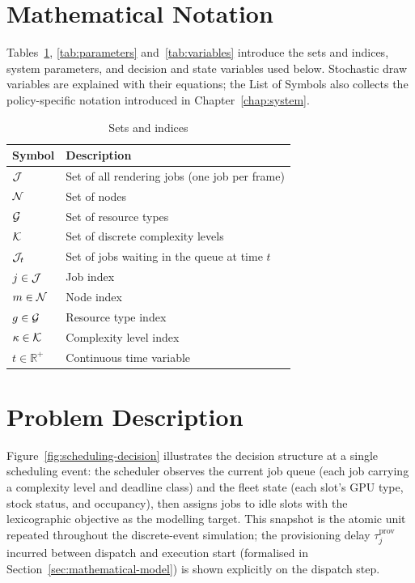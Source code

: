 \section{Mathematical Notation}
\label{sec:mathematical-notation}

Tables~\ref{tab:sets}, \ref{tab:parameters} and~\ref{tab:variables} introduce the sets and indices, system parameters, and decision and state variables used below. Stochastic draw variables are explained with their equations; the List of Symbols also collects the policy-specific notation introduced in Chapter~\ref{chap:system}.

\begin{table}[htbp]
\centering
\caption{Sets and indices}
\label{tab:sets}
\begin{tabular}{ll}
\toprule
\textbf{Symbol} & \textbf{Description} \\
\midrule
$\mathcal{J}$ & Set of all rendering jobs (one job per frame) \\
$\mathcal{N}$ & Set of nodes \\
$\mathcal{G}$ & Set of resource types \\
$\mathcal{K}$ & Set of discrete complexity levels \\
$\mathcal{J}_t$ & Set of jobs waiting in the queue at time $t$ \\
$j \in \mathcal{J}$ & Job index \\
$m \in \mathcal{N}$ & Node index \\
$g \in \mathcal{G}$ & Resource type index \\
$\kappa \in \mathcal{K}$ & Complexity level index \\
$t \in \mathbb{R}^+$ & Continuous time variable \\
\bottomrule
\end{tabular}
\end{table}

\section{Problem Description}
\label{sec:problem-description}

Figure~\ref{fig:scheduling-decision} illustrates the decision structure at a single scheduling event: the scheduler observes the current job queue (each job carrying a complexity level and deadline class) and the fleet state (each slot's GPU type, stock status, and occupancy), then assigns jobs to idle slots with the lexicographic objective as the modelling target. This snapshot is the atomic unit repeated throughout the discrete-event simulation; the provisioning delay $\tau_j^{\text{prov}}$ incurred between dispatch and execution start (formalised in Section~\ref{sec:mathematical-model}) is shown explicitly on the dispatch step.

